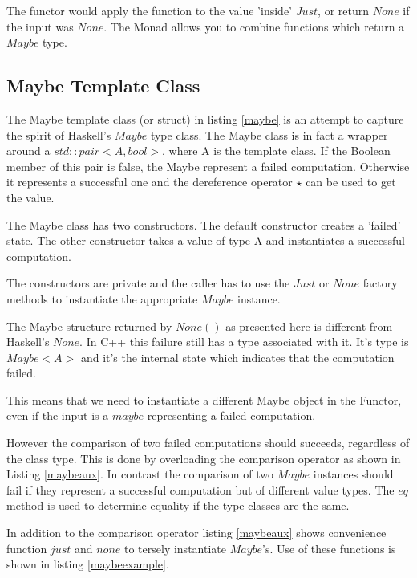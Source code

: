 \documentclass[12pt,fleqn]{article}
\begin{document}
 
The functor would apply the function to the value 'inside' $Just$, or return $None$ if the input was $None$.
The Monad allows you to combine functions which return a $Maybe$ type.

%
\subsection{Maybe Template Class}
%
%
The Maybe template class (or struct) in listing \ref{maybe} is an attempt to capture the spirit of Haskell's $Maybe$ type class.
The Maybe class is in fact a wrapper around a $std::pair<A,bool>$, where A is the template class.
If the Boolean member of this pair is false, the Maybe represent a failed computation.
Otherwise it represents a successful one and the dereference operator $\star$ can be used to get the value.

The Maybe class has two constructors. The default constructor creates a 'failed' state. 
The other constructor takes a value of type A and instantiates a successful computation.

The constructors are private and the caller has to use the $Just$ or $None$ factory methods to instantiate the appropriate $Maybe$ instance.

The Maybe structure returned by $None()$ as presented here is different from Haskell's $None$. 
In C++ this failure still has a type associated with it. 
It's type is $Maybe<A>$ and it's the internal state which indicates that the computation failed.

This means that we need to instantiate a different  Maybe object in the Functor, 
even if the input is a $maybe$ representing a failed computation.

However the comparison of two failed computations should succeeds, regardless of the class type.
This is done by overloading the comparison operator as shown in Listing \ref{maybeaux}.
In contrast the comparison of two $Maybe$ instances should fail if they represent a successful computation but of different value types.
The $eq$ method is used to determine equality if the type classes are the same.

In addition to the comparison operator listing \ref{maybeaux} shows convenience function $just$ and $none$ to tersely instantiate $Maybe$'s.
Use of these functions is shown in listing \ref{maybeexample}.
%
%
%
%
\end{document}
